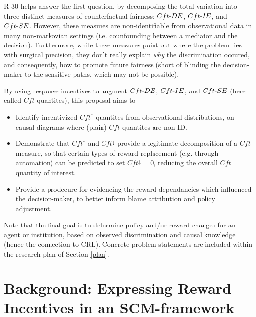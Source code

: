 \documentclass[letterpaper,10pt]{article}
\begin{document}
R-30 \cite{r30} helps answer the first question, by decomposing the total variation into three distinct measures of counterfactual fairness: $Cft{\text -}DE$, $Cft{\text -}IE$, and $Cft{\text -}SE$. However, these measures are non-identifiable from observational data in many non-markovian settings (i.e. counfounding between a mediator and the decision). Furthermore, while these measures point out where the problem lies with surgical precision, they don't really explain \emph{why} the discrimination occured, and consequently, how to promote future fairness (short of blinding the decision-maker to the sensitive paths, which may not be possible). 

By using response incentives \cite{everitt2021agent, everitt2022understanding} to augment $Cft{\text -}DE$, $Cft{\text -}IE$, and $Cft{\text -}SE$ (here called $Cft$ quantites), this proposal aims to
\begin{itemize}
  \item Identify incentivized $Cft^\uparrow$ quantites from observational distributions, on causal diagrams where (plain) $Cft$ quantites are non-ID. 
  \item Demonstrate that $Cft^\uparrow$ and $Cft^\downarrow$ provide a legitimate decomposition of a $Cft$ measure, so that certain types of reward replacement (e.g. through automation) can be predicted to set $Cft^\downarrow=0$, reducing the overall $Cft$ quantity of interest.
  \item Provide a prodecure for evidencing the reward-dependancies which influenced the decision-maker, to better inform blame attribution and policy adjustment.
\end{itemize}
Note that the final goal is to determine policy and/or reward changes for an agent or institution, based on observed discrimination and causal knowledge (hence the connection to CRL).
Concrete problem statements are included within the research plan of Section \ref{plan}.



\section{Background: Expressing Reward Incentives in an SCM-framework}
\end{document}
